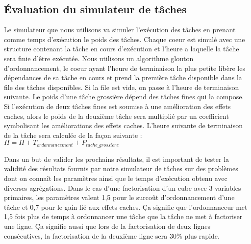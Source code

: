 \subsection{\'Evaluation du simulateur de tâches}
Le simulateur que nous utilisons va simuler l'exécution des tâches en prenant comme temps d'exécution le poids des tâches.
%
Chaque coeur est simulé avec une structure contenant la tâche en cours d'exécution et l'heure a laquelle la tâche sera finie d'être exécutée.
%
Nous utilisons un algorithme glouton d'ordonnancement, le coeur ayant l'heure de terminaison la plus petite libère les dépendances de sa tâche en cours et prend la première tâche disponible dans la file des tâches disponibles.
%
Si la file est vide, on passe à l'heure de terminaison suivante.
%
Le poids d'une tâche grossière dépend des tâches fines qui la compose.
%
Si l'exécution de deux tâches fines est soumise à une amélioration des effets caches, alors le poids de la deuxième tâche sera multiplié par un coefficient symbolisant les améliorations des effets caches.
%
L'heure suivante de terminaison de la tâche sera calculée de la façon suivante : $H = H + T_{ordonnancement} + P_{tache\_grossiere}$



Dans un but de valider les prochains résultats, il est important de tester la validité des résultats fournis par notre simulateur de tâches sur des problèmes dont on connaît les paramètres ainsi que le temps d'exécution obtenu avec diverses agrégations.
%
Dans le cas d'une factorisation d'un cube avec 3 variables primaires, les paramètres valent 1,5 pour le surcoût d'ordonnancement d'une tâche et 0,7 pour le gain lié aux effets caches.
%
Ça signifie que l'ordonnanceur met 1,5 fois plus de temps à ordonnancer une tâche que la tâche ne met à factoriser une ligne.
%
Ça signifie aussi que lors de la factorisation de deux lignes consécutives, la factorisation de la deuxième ligne sera 30\% plus rapide.
